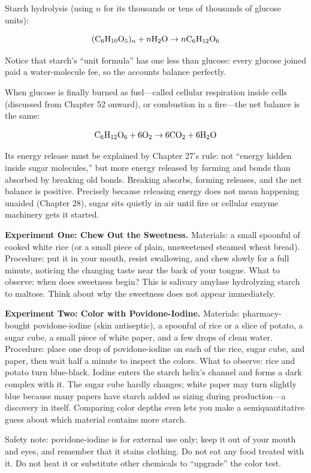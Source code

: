 Starch hydrolysis (using $n$ for its thousands or tens of thousands of glucose units):

\[(\mathrm{C_6H_{10}O_5})_n + n\mathrm{H_2O} \rightarrow n\mathrm{C_6H_{12}O_6}\]

Notice that starch's ``unit formula'' has one less  than glucose: every glucose joined paid a water-molecule fee, so the accounts balance perfectly.

When glucose is finally burned as fuel---called cellular respiration inside cells (discussed from Chapter 52 onward), or combustion in a fire---the net balance is the same:

\[\mathrm{C_6H_{12}O_6} + 6\mathrm{O_2} \rightarrow 6\mathrm{CO_2} + 6\mathrm{H_2O}\]

Its energy release must be explained by Chapter 27's rule: not ``energy hidden inside sugar molecules,'' but more energy released by forming  and  bonds than absorbed by breaking old bonds. Breaking absorbs, forming releases, and the net balance is positive. Precisely because releasing energy does not mean happening unaided (Chapter 28), sugar sits quietly in air until fire or cellular enzyme machinery gets it started.

\begin{shiyan}
\textbf{Experiment One: Chew Out the Sweetness.} Materials: a small spoonful of cooked white rice (or a small piece of plain, unsweetened steamed wheat bread). Procedure: put it in your mouth, resist swallowing, and chew slowly for a full minute, noticing the changing taste near the back of your tongue. What to observe: when does sweetness begin? This is salivary amylase hydrolyzing starch to maltose. Think about why the sweetness does not appear immediately.

\textbf{Experiment Two: Color with Povidone-Iodine.} Materials: pharmacy-bought povidone-iodine (skin antiseptic), a spoonful of rice or a slice of potato, a sugar cube, a small piece of white paper, and a few drops of clean water. Procedure: place one drop of povidone-iodine on each of the rice, sugar cube, and paper, then wait half a minute to inspect the colors. What to observe: rice and potato turn blue-black. Iodine enters the starch helix's channel and forms a dark complex with it. The sugar cube hardly changes; white paper may turn slightly blue because many papers have starch added as sizing during production---a discovery in itself. Comparing color depths even lets you make a semiquantitative guess about which material contains more starch.

Safety note: povidone-iodine is for external use only; keep it out of your mouth and eyes, and remember that it stains clothing. Do not eat any food treated with it. Do not heat it or substitute other chemicals to ``upgrade'' the color test.
\end{shiyan}


